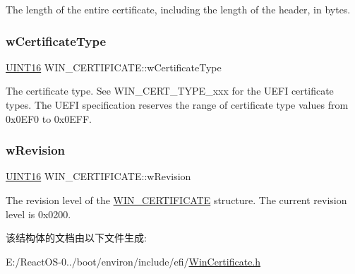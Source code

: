 The length of the entire certificate, including the length of the header, in bytes. \mbox{\label{struct_w_i_n___c_e_r_t_i_f_i_c_a_t_e_aa92a5b12fe2b12edf0f88828c18d8e56}} 
\subsubsection{\texorpdfstring{w\+Certificate\+Type}{wCertificateType}}
{\footnotesize\ttfamily \hyperlink{_processor_bind_8h_a09f1a1fb2293e33483cc8d44aefb1eb1}{U\+I\+N\+T16} W\+I\+N\+\_\+\+C\+E\+R\+T\+I\+F\+I\+C\+A\+T\+E\+::w\+Certificate\+Type}

The certificate type. See W\+I\+N\+\_\+\+C\+E\+R\+T\+\_\+\+T\+Y\+P\+E\+\_\+xxx for the U\+E\+FI certificate types. The U\+E\+FI specification reserves the range of certificate type values from 0x0\+E\+F0 to 0x0\+E\+FF. \mbox{\label{struct_w_i_n___c_e_r_t_i_f_i_c_a_t_e_a0c6bfd00e903eea3ba5fcbfbb3afd96d}} 
\subsubsection{\texorpdfstring{w\+Revision}{wRevision}}
{\footnotesize\ttfamily \hyperlink{_processor_bind_8h_a09f1a1fb2293e33483cc8d44aefb1eb1}{U\+I\+N\+T16} W\+I\+N\+\_\+\+C\+E\+R\+T\+I\+F\+I\+C\+A\+T\+E\+::w\+Revision}

The revision level of the \hyperlink{struct_w_i_n___c_e_r_t_i_f_i_c_a_t_e}{W\+I\+N\+\_\+\+C\+E\+R\+T\+I\+F\+I\+C\+A\+TE} structure. The current revision level is 0x0200. 

该结构体的文档由以下文件生成\+:\begin{DoxyCompactItemize}
\item 
E\+:/\+React\+O\+S-\/0../boot/environ/include/efi/\hyperlink{_win_certificate_8h}{Win\+Certificate.\+h}\end{DoxyCompactItemize}
